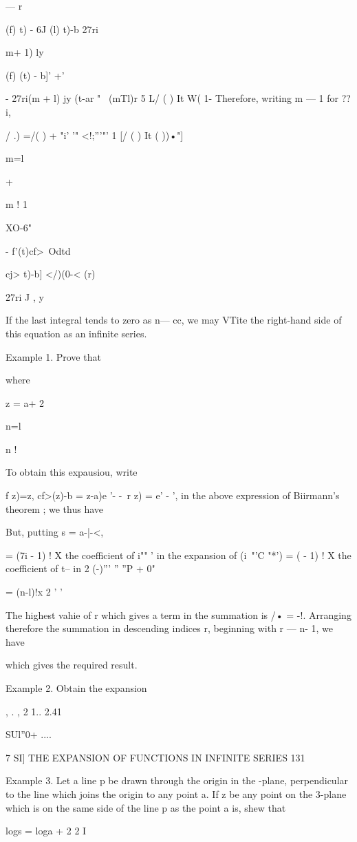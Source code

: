 — r

(f) t) - 6J (l) t)-b 27ri

 m+ 1) ly

 (f) (t) - b]' +'

- 27ri(m + l) jy (t-ar " ~(mTl)r 5 L/ ( ) It W( 1- Therefore, writing
m — 1 for ??i,

/ .) =/( ) + "i' '" <!;'''"' 1 [/ ( ) It ( ))•"]

m=l

+

m ! 1

XO-6"

- f'(t)cf>\ Odtd

cj> t)-b] </)(0-< (r)

27ri J , y

If the last integral tends to zero as n— cc, we may VTite the
right-hand side of this equation as an infinite series.

Example 1. Prove that

where

z = a+ 2

n=l

n !

To obtain this expausiou, write

f z)=z, cf>(z)-b = z-a)e '- -\ r z) = e' - ', in the above expression
of Biirmann's theorem ; we thus have

But, putting s = a-|-<,

= (7i - 1) ! X the coefficient of i"" ' in the expansion of (i~"'C
"*') = ( - 1) ! X the coefficient of t-- in 2 (-)''' '' ''P + 0"

= (n-l)!x 2 ' '

The highest vahie of r which gives a term in the summation is /• = -!.
Arranging therefore the summation in descending indices r, beginning
with r — n- 1, we have

which gives the required result.

Example 2. Obtain the expansion

, . , 2 1.. 2.41

SUl''0+ ....

7 SI] THE EXPANSION OF FUNCTIONS IN INFINITE SERIES 131

Example 3. Let a line p be drawn through the origin in the -plane,
perpendicular to the line which joins the origin to any point a. If z
be any point on the 3-plane which is on the same side of the line p as
the point a is, shew that

logs = loga + 2 2 I


